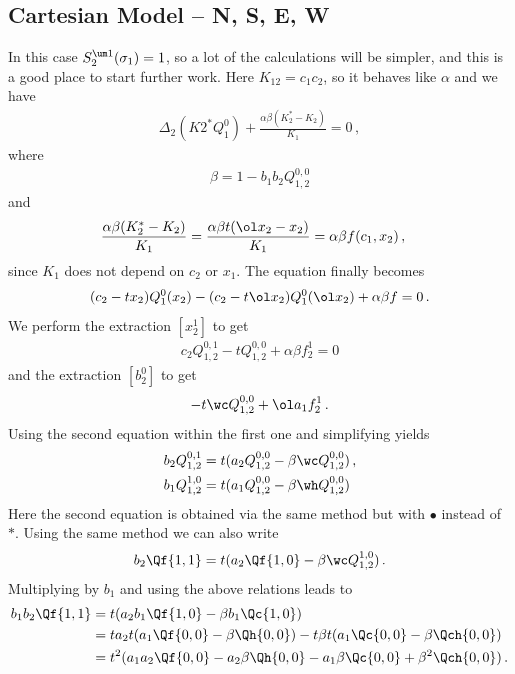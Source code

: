 \subsection{Cartesian Model -- N, S, E, W}
In this case $S_2^{\um 1}(\sigma_1) = 1$, so a lot of the calculations will be simpler, and this is a good place to start further work. Here $K_{12} = c_1c_2$, so it behaves like $\alpha$ and we have
\begin{align}
	\Delta_2(K2^\ast Q_1^0) + \frac{\alpha\beta(K_2^\ast-K_2)}{K_1}=0\,,
\end{align}
where
\begin{align}
	\beta =  1-b_1b_2 Q_{1,2}^{0,0}
\end{align}
and
\begin{align}
	\frac{\alpha\beta(K_2^\ast -K_2)}{K_1}  &= \frac{\alpha\beta t (\ol x_2 - x_2)}{K_1} = \alpha\beta f(c_1,x_2)\,,
\end{align}
since $K_1$ does not depend on $c_2$ or $x_1$. The equation finally becomes
\begin{align}
	(c_2-tx_2)Q_1^0(x_2) - (c_2-t\ol x_2)Q_1^0(\ol x_2) + \alpha\beta f = 0\,.
\end{align}
We perform the extraction $[x_2^1]$ to get
\begin{align}
	c_2Q_{1,2}^{0,1}-t Q_{1,2}^{0,0} + \alpha\beta f_2^1 = 0
\end{align}
and the extraction $[b_2^0]$ to get
\begin{align}
	- t \wc Q_{1,2}^{0,0} +  \ol a_1f_2^1\,.
\end{align}
Using the second equation within the first one and simplifying yields
\begin{align}
	b_2 Q_{1,2}^{0,1} &= t(a_2 Q_{1,2}^{0,0} - \beta \wc Q_{1,2}^{0,0})\,,\\
	b_1 Q_{1,2}^{1,0} &= t(a_1 Q_{1,2}^{0,0} - \beta \wh Q_{1,2}^{0,0})
\end{align}
Here the second equation is obtained via the same method but with $\bullet$ instead of $\ast$. Using the same method we can also write
\begin{align}
	b_2 \Qf{1,1} = t(a_2 \Qf{1,0}-\beta \wc Q_{1,2}^{1,0})\,.
\end{align}
Multiplying by $b_1$ and using the above relations leads to
\begin{align}
\begin{split}
	b_1b_2 \Qf{1,1} &= t(a_2b_1\Qf{1,0}-\beta b_1 \Qc{1,0})\\
			      &=t a_2t(a_1\Qf{0,0}-\beta \Qh{0,0})-t\beta t(a_1\Qc{0,0}-\beta\Qch{0,0})\\	
			      &=t^2(a_1a_2\Qf{0,0}-a_2\beta\Qh{0,0}-a_1\beta\Qc{0,0}+\beta^2\Qch{0,0})\,.
\end{split}
\end{align}
